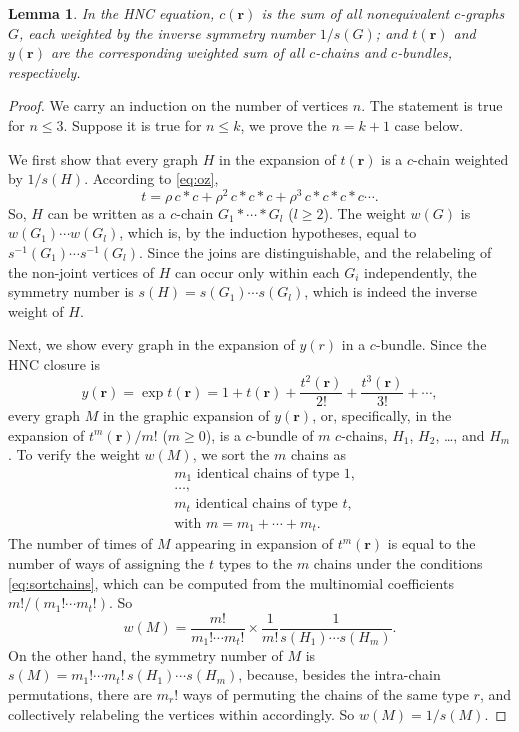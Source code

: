 \documentclass[aip,jcp,reprint,superscriptaddress]{revtex4-1}
\newtheorem{lemm}[thrm]{Lemma}
\newcommand{\vct}[1]{\mathbf{#1}}
\providecommand{\vr}{} %
\renewcommand{\vr}{\vct{r}}
\begin{document}
\begin{lemm}
In the HNC equation,
%
$c(\vr)$
  is the sum of all nonequivalent $c$-graphs $G$,
  each weighted by the inverse symmetry number $1/s(G)$;
and $t(\vr)$ and $y(\vr)$ are the corresponding weighted sum of all
  $c$-chains and $c$-bundles, respectively.
  \label{thm:hnccr}
\end{lemm}
%
%
%
\begin{proof}
%
We carry an induction on the number of vertices $n$.
%
The statement is true for $n \le 3$.
%
Suppose it is true for $n \le k$,
  we prove the $n = k + 1$ case below.


We first show that
  every graph $H$ in the expansion of $t(\vr)$
  is a $c$-chain weighted by $1/s(H)$.
%
According to \eqref{eq:oz},
\[
  t = \rho \, c*c + \rho^2 \, c * c * c + \rho^3 \, c*c*c*c \cdots.
\]
So, $H$ can be written as a $c$-chain
  $G_1 * \cdots * G_l$ ($l \ge 2$).
%
The weight $w(G)$ is
  $w(G_1) \cdots w(G_l)$,
  which is, by the induction hypotheses, equal to
  $s^{-1}(G_1) \cdots s^{-1}(G_l)$.
%
Since the joins are distinguishable,
  and the relabeling of the non-joint vertices  of $H$
  can occur only within each $G_i$ independently,
  the symmetry number is
  $s(H) = s(G_1) \cdots s(G_l)$,
  which is indeed the inverse weight of $H$.

Next, we show every graph in the expansion of $y(r)$
  in a $c$-bundle.
%
Since the HNC closure is
\[
  y(\vr)
= \exp t(\vr)
=
1 + t(\vr)
+ \frac{ t^2(\vr) }{ 2! }
+ \frac{ t^3(\vr) }{ 3! }+ \cdots,
\]
every graph $M$ in the graphic expansion of $y(\vr)$,
  or, specifically, in the expansion of $t^m(\vr)/m!$ ($m \ge 0$),
  is a $c$-bundle of $m$ $c$-chains,
  $H_1$, $H_2$, \dots, and $H_m$.
%
%
To verify the weight $w(M)$,
  we sort the $m$ chains as
\begin{equation}
\begin{split}
& \text{$m_1$ identical chains of type $1$}, \\
& \dots, \\
& \text{$m_t$ identical chains of type $t$}, \\
& \text{with $m = m_1 + \cdots + m_t$}.
\end{split}\label{eq:sortchains}
\end{equation}
%
The number of times of $M$
  appearing in expansion of $t^m(\vr)$
  is equal to the number of ways
  of assigning the $t$ types to the $m$ chains
  under the conditions \eqref{eq:sortchains},
  which can be computed from the multinomial coefficients
  $m!/(m_1! \cdots m_t!)$.
%
So
%
\[
  w(M)
=
  \frac{ m! } { m_1! \cdots m_t! }
  \times
  \frac{ 1 } { m! }
  \frac{ 1 } { s(H_1) \cdots s(H_m) }.
\]
%
On the other hand,
  the symmetry number of $M$ is
  $s(M) = m_1! \cdots m_t! \, s(H_1) \cdots s(H_m)$,
  because, besides the intra-chain permutations,
  there are $m_r!$ ways of permuting the chains of the same type $r$,
  and collectively relabeling the vertices within accordingly.
So $w(M) = 1/s(M)$.
%


\end{proof}
\end{document}
